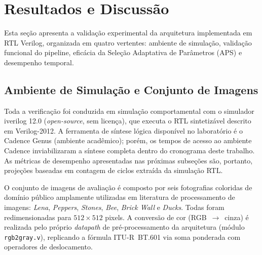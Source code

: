 %

\section{Resultados e Discussão}
\label{sec:resultados}

Esta seção apresenta a validação experimental da arquitetura implementada em RTL Verilog,
organizada em quatro vertentes: ambiente de simulação, validação funcional do pipeline,
eficácia da Seleção Adaptativa de Parâmetros (APS) e desempenho temporal.

\subsection{Ambiente de Simulação e Conjunto de Imagens}
\label{ssec:ambiente}

Toda a verificação foi conduzida em simulação comportamental com o simulador iverilog 12.0
(\textit{open-source}, sem licença), que executa o RTL sintetizável descrito em Verilog-2012.
A ferramenta de síntese lógica disponível no laboratório é o Cadence Genus (ambiente acadêmico);
porém, os tempos de acesso ao ambiente Cadence inviabilizaram a síntese completa dentro do
cronograma deste trabalho. As métricas de desempenho apresentadas nas próximas subseções
são, portanto, projeções baseadas em contagem de ciclos extraída da simulação RTL.

O conjunto de imagens de avaliação é composto por seis fotografias coloridas de domínio
público amplamente utilizadas em literatura de processamento de imagens:
\textit{Lena}, \textit{Peppers}, \textit{Stones}, \textit{Bee}, \textit{Brick Wall} e
\textit{Ducks}. Todas foram redimensionadas para $512 \times 512$ pixels.
A conversão de cor (RGB~$\to$~cinza) é realizada pelo próprio \textit{datapath} de
pré-processamento da arquitetura (módulo \texttt{rgb2gray.v}), replicando a fórmula
ITU-R~BT.601 via soma ponderada com operadores de deslocamento.

